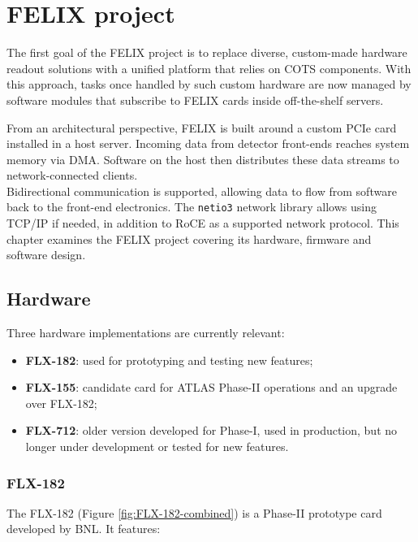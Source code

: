 \chapter{\acs{FELIX} project}

The first goal of the \acs{FELIX} project is to replace diverse, custom-made hardware readout solutions with a unified platform that relies on \acf{COTS} components. With this approach, tasks once handled by such custom hardware are now managed by software modules that subscribe to \acs{FELIX} cards inside off-the-shelf servers.

From an architectural perspective, \acs{FELIX} is built around a custom \acs{PCIe} card installed in a host server. Incoming data from detector front-ends reaches system memory via \acf{DMA}. Software on the host then distributes these data streams to network-connected clients.\\
Bidirectional communication is supported, allowing data to flow from software back to the front-end electronics. The \texttt{netio3} network library allows using TCP/IP if needed, in addition to \acf{RoCE} as a supported network protocol. This chapter examines the \acs{FELIX} project covering its hardware, firmware and software design.

\clearpage
\section{Hardware}

Three hardware implementations are currently relevant:

\begin{itemize}
    \item \textbf{FLX-182}: used for prototyping and testing new features;
    
    \item \textbf{FLX-155}: candidate card for \acs{ATLAS} Phase-II operations and an upgrade over FLX-182;
    
    \item \textbf{FLX-712}: older version developed for Phase-I, used in production, but no longer under development or tested for new features.
\end{itemize}

\subsection{FLX-182}

The FLX-182 \cite{Ilic:2873569} (Figure \ref{fig:FLX-182-combined}) is a Phase-II prototype card developed by \acf{BNL}. It features:

